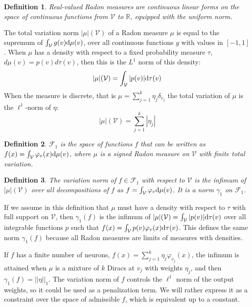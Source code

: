 \documentclass[a4paper, 11pt]{scrartcl}
\newtheorem{definition}{Definition}[section]
\begin{document}
\begin{definition}
Real-valued Radon measures are continuous linear forms on the space of continuous functions from $\mathcal{V}$ to $\mathbb{R}$, equipped with the uniform norm.
\end{definition}

The total variation norm $|\mu|(\mathcal{V})$ of a Radon measure $\mu$  is equal to the supremum of $\int_\mathcal{V} g(v)\textnormal{d}\mu(v)$, over all continuous functions $g$ with values in $[-1, 1]$. When $\mu$ has a density with respect to a fixed probability measure $\tau$, ${d}\mu(v) = p(v) {d}\tau(v)$, then this is the $L^1$ norm of this density: $$|\mu|(\mathcal{V}) = \int_\mathcal{V} |p(v)| \textnormal{d}\tau(v)$$
When the measure is discrete, that is $\mu = \sum_{j=1}^k \eta_j \delta_{v_j}$ the total variation of $\mu$ is the $\ell^1$-norm of $\eta$:
$$|\mu|(\mathcal{V}) = \sum_{j=1}^k |\eta_j|  $$

\begin{definition}
$\mathcal{F}_1$ is the space of functions $f$ that can be written as
$f(x)= \int_\mathcal{V} \varphi_v(x)\textnormal{d}\mu(v)$,
where $\mu$ is a signed Radon measure on $\mathcal{V}$ with finite total variation.
\end{definition}

\begin{definition}
The variation norm of $f \in \mathcal{F}_1$ with respect to $\mathcal{V}$ is the infimum of $|\mu|(\mathcal{V})$ over all decompositions of $f$ as $f= \int_\mathcal{V} \varphi_v\textnormal{d}\mu(v)$. It is a norm $\gamma_1$ on $\mathcal{F}_1$.
\end{definition}

If we assume in this definition that $\mu$ must have a density with respect to $\tau$ with full support on $\mathcal{V}$, then $\gamma_1(f)$ is the infimum of $|\mu|(\mathcal{V}) = \int_\mathcal{V} |p(v)| \textnormal{d}\tau(v)$ over all integrable functions $p$ such that $f(x) = \int_\mathcal{V} p(v) \varphi_v(x)\textnormal{d}\tau(v)$. This defines the same norm $\gamma_1(f)$ because all Radon measures are limits of measures with densities.

If $f$ has a finite number of neurons, $f(x) = \sum_{j=1}^k \eta_j \varphi_{v_j}(x)$, the infimum is attained when $\mu$ is a mixture of $k$ Diracs at $v_j$ with weights $\eta_j$, and then $\gamma_1(f) = ||\eta||_1$. The variation norm of $f$ controls the $\ell^1$ norm of the output weights, so it could be used as a penalization term. We will rather express it as a constraint over the space of admissible $f$, which is equivalent up to a constant.
\end{document}
